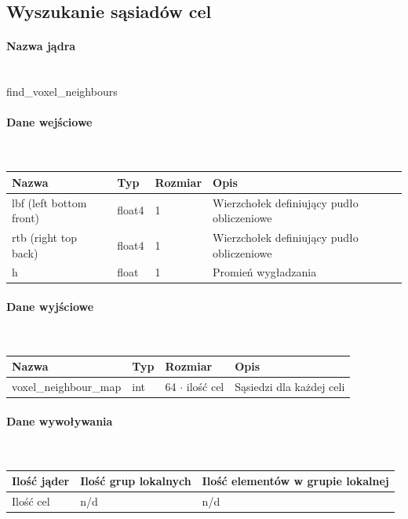 \documentclass[polish, 12pt]{aghthesis}
\begin{document}
		\subsection{Wyszukanie sąsiadów cel}
			\paragraph{Nazwa jądra} \ \\
				find\_voxel\_neighbours
			\paragraph{Dane wejściowe} \ \\
					\begin{tabular}{| p{} | p{} | p{} | p{} |}
					\hline
						Nazwa & Typ & Rozmiar & Opis \\
					\hline
						lbf (left bottom front)& float4 & 1 & Wierzchołek definiujący pudło obliczeniowe \\ 
					\hline
						rtb (right top back) & float4 & 1 & Wierzchołek definiujący pudło obliczeniowe  \\ 
					\hline
						h & float & 1 & Promień wygładzania \\ 
					\hline
    				\end{tabular}
			\paragraph{Dane wyjściowe} \ \\
				\begin{tabular}{| p{} | p{} | p{} | p{} |}
				\hline
					Nazwa & Typ & Rozmiar & Opis \\
				\hline
					voxel\_neighbour\_map & int & 64 ${\cdot}$ ilość cel & Sąsiedzi dla każdej celi \\ 
				\hline
				\end{tabular}
			\paragraph{Dane wywoływania} \ \\
					\begin{tabular}{| p{} | p{} | p{}|}
					\hline
						Ilość jąder & Ilość grup lokalnych & Ilość elementów w grupie lokalnej \\
					\hline
						Ilość cel & n/d & n/d \\ 
					\hline
    				\end{tabular}
\end{document}
